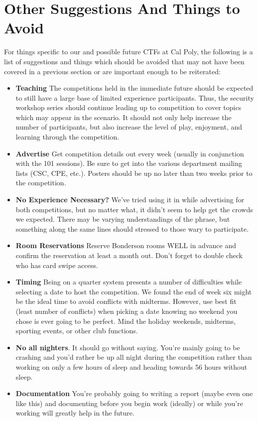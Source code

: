 \documentclass[10pt]{article}
\begin{document}
\section{Other Suggestions And Things to Avoid}
For things specific to our and possible future CTFs at Cal Poly, the following
is a list of suggestions and things which should be avoided that may not have
been covered in a previous section or are important enough to be reiterated:
\begin{itemize}
    \item \textbf{Teaching} The competitions held in the immediate future should
    be expected to still have a large base of limited experience participants.
    Thus, the security workshop series should continue leading up to competition
    to cover topics which may appear in the scenario. It should not only help
    increase the number of participants, but also increase the level of play,
    enjoyment, and learning through the competition.
    \item \textbf{Advertise} Get competition details out every week (usually in
    conjunction with the 101 sessions). Be sure to get into the various
    department mailing lists (CSC, CPE, etc.). Posters should be up no later
    than two weeks prior to the competition.
    \item \textbf{No Experience Necessary?} We've tried using it in while
    advertising for both competitions, but no matter what, it didn't seem to
    help get the crowds we expected. There may be varying understandings of the
    phrase, but something along the same lines should stressed to those wary
    to participate.
    \item \textbf{Room Reservations} Reserve Bonderson rooms WELL in advance and
    confirm the reservation at least a month out. Don't forget to double check
    who has card swipe access.
    \item \textbf{Timing} Being on a quarter system presents a number of
    difficulties while selecting a date to host the competition. We found the end
    of week six might be the ideal time to avoid conflicts with midterms.
    However, use best fit (least number of conflicts) when picking a date
    knowing no weekend you chose is ever going to be perfect. Mind the holiday
    weekends, midterms, sporting events, or other club functions.
    \item \textbf{No all nighters}. It should go without saying. You're mainly
    going to be crashing and you'd rather be up all night during the
    competition rather than working on only a few hours of sleep and heading
    towards 56 hours without sleep.
    \item \textbf{Documentation} You're probably going to writing a report
    (maybe even one like this) and documenting before you begin work (ideally)
    or while you're working will greatly help in the future.
\end{itemize}
\end{document}
